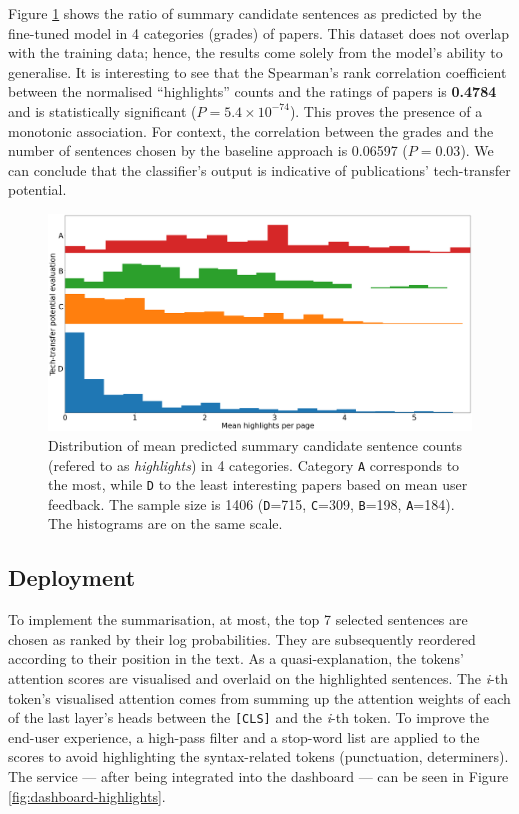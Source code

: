 Figure \ref{fig:histograms} shows the ratio of summary candidate sentences as predicted by the fine-tuned model in 4 categories (grades) of papers. This dataset does not overlap with the training data; hence, the results come solely from the model's ability to generalise. It is interesting to see that the Spearman's rank correlation coefficient \cite{spearman1961proof} between the normalised ``highlights'' counts and the ratings of papers is \textbf{0.4784} and is statistically significant ($P = 5.4 \times 10^{-74}$). This proves the presence of a monotonic association. For context, the correlation between the grades and the number of sentences chosen by the baseline approach is 0.06597 ($P = 0.03$). We can conclude that the classifier's output is indicative of publications' tech-transfer potential. 

\begin{figure}
    \centering
    \includegraphics[width=0.85\linewidth]{figures/highlights-histograms.png}
    \captionsetup{width=.9\linewidth}
    \caption{Distribution of mean predicted summary candidate sentence counts (refered to as \textit{highlights}) in 4 categories. Category \texttt{A} corresponds to the most, while \texttt{D} to the least interesting papers based on mean user feedback. The sample size is 1406 (\texttt{D}=715, \texttt{C}=309, \texttt{B}=198, \texttt{A}=184). The histograms are on the same scale.}
    \label{fig:histograms}
\end{figure}

\subsection{Deployment}

To implement the summarisation, at most, the top 7 selected sentences are chosen as ranked by their log probabilities. They are subsequently reordered according to their position in the text. As a quasi-explanation, the tokens' attention scores are visualised and overlaid on the highlighted sentences. The \textit{i}-th token's visualised attention comes from summing up the attention weights of each of the last layer's heads between the \texttt{[CLS]} and the \textit{i}-th token. To improve the end-user experience, a high-pass filter and a stop-word list are applied to the scores to avoid highlighting the syntax-related tokens (punctuation, determiners). The service --- after being integrated into the dashboard --- can be seen in Figure \ref{fig:dashboard-highlights}.

